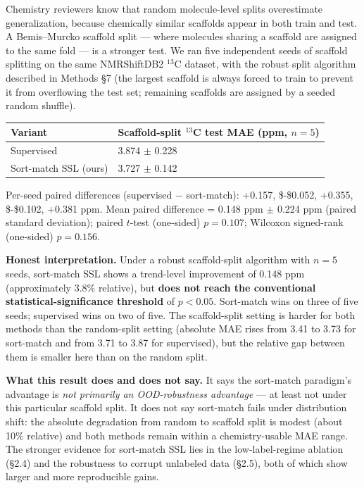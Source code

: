 \documentclass[
]{article}
\newcounter{none} %
\begin{document}
Chemistry reviewers know that random molecule-level splits overestimate
generalization, because chemically similar scaffolds appear in both
train and test. A Bemis--Murcko scaffold split --- where molecules
sharing a scaffold are assigned to the same fold --- is a stronger test.
We ran five independent seeds of scaffold splitting on the same
NMRShiftDB2 \(^{13}\)C dataset, with the robust split algorithm
described in Methods §7 (the largest scaffold is always forced to train
to prevent it from overflowing the test set; remaining scaffolds are
assigned by a seeded random shuffle).

{\def\LTcaptype{none} %
\begin{longtable}[]{@{}ll@{}}
\toprule\noalign{}
Variant & Scaffold-split \(^{13}\)C test MAE (ppm, \(n=5\)) \\
\midrule\noalign{}
\endhead
\bottomrule\noalign{}
\endlastfoot
Supervised & 3.874 \(\pm\) 0.228 \\
Sort-match SSL (ours) & 3.727 \(\pm\) 0.142 \\
\end{longtable}
}

Per-seed paired differences (supervised \(-\) sort-match): +0.157,
\$-\$0.052, +0.355, \$-\$0.102, +0.381 ppm. Mean paired difference =
0.148 ppm \(\pm\) 0.224 ppm (paired standard deviation); paired
\(t\)-test (one-sided) \(p = 0.107\); Wilcoxon signed-rank (one-sided)
\(p = 0.156\).

\textbf{Honest interpretation.} Under a robust scaffold-split algorithm
with \(n=5\) seeds, sort-match SSL shows a trend-level improvement of
0.148 ppm (approximately 3.8\% relative), but \textbf{does not reach the
conventional statistical-significance threshold} of \(p < 0.05\).
Sort-match wins on three of five seeds; supervised wins on two of five.
The scaffold-split setting is harder for both methods than the
random-split setting (absolute MAE rises from 3.41 to 3.73 for
sort-match and from 3.71 to 3.87 for supervised), but the relative gap
between them is smaller here than on the random split.

\textbf{What this result does and does not say.} It says the sort-match
paradigm's advantage is \emph{not primarily an OOD-robustness advantage}
--- at least not under this particular scaffold split. It does not say
sort-match fails under distribution shift: the absolute degradation from
random to scaffold split is modest (about 10\% relative) and both
methods remain within a chemistry-usable MAE range. The stronger
evidence for sort-match SSL lies in the low-label-regime ablation (§2.4)
and the robustness to corrupt unlabeled data (§2.5), both of which show
larger and more reproducible gains.
\end{document}
